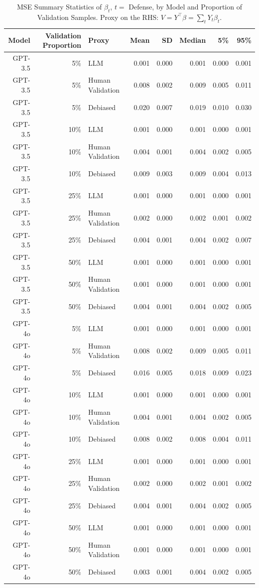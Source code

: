 \begin{table}

\caption{\label{tab:unnamed-chunk-1}MSE Summary Statistics of $\beta_{t}$, $t=$ Defense, by Model and Proportion of Validation Samples.
      Proxy on the RHS: $V = Y^\top \beta = \sum_{t} Y_t \beta_t$.}
\centering
\begin{tabular}[t]{rrlrrrrr}
\toprule
Model & Validation Proportion & Proxy & Mean & SD & Median & 5\% & 95\%\\
\midrule
GPT-3.5 & 5\% & LLM & 0.001 & 0.000 & 0.001 & 0.000 & 0.001\\
GPT-3.5 & 5\% & Human Validation & 0.008 & 0.002 & 0.009 & 0.005 & 0.011\\
GPT-3.5 & 5\% & Debiased & 0.020 & 0.007 & 0.019 & 0.010 & 0.030\\
GPT-3.5 & 10\% & LLM & 0.001 & 0.000 & 0.001 & 0.000 & 0.001\\
GPT-3.5 & 10\% & Human Validation & 0.004 & 0.001 & 0.004 & 0.002 & 0.005\\
GPT-3.5 & 10\% & Debiased & 0.009 & 0.003 & 0.009 & 0.004 & 0.013\\
GPT-3.5 & 25\% & LLM & 0.001 & 0.000 & 0.001 & 0.000 & 0.001\\
GPT-3.5 & 25\% & Human Validation & 0.002 & 0.000 & 0.002 & 0.001 & 0.002\\
GPT-3.5 & 25\% & Debiased & 0.004 & 0.001 & 0.004 & 0.002 & 0.007\\
GPT-3.5 & 50\% & LLM & 0.001 & 0.000 & 0.001 & 0.000 & 0.001\\
GPT-3.5 & 50\% & Human Validation & 0.001 & 0.000 & 0.001 & 0.000 & 0.001\\
GPT-3.5 & 50\% & Debiased & 0.004 & 0.001 & 0.004 & 0.002 & 0.005\\
GPT-4o & 5\% & LLM & 0.001 & 0.000 & 0.001 & 0.000 & 0.001\\
GPT-4o & 5\% & Human Validation & 0.008 & 0.002 & 0.009 & 0.005 & 0.011\\
GPT-4o & 5\% & Debiased & 0.016 & 0.005 & 0.018 & 0.009 & 0.023\\
GPT-4o & 10\% & LLM & 0.001 & 0.000 & 0.001 & 0.000 & 0.001\\
GPT-4o & 10\% & Human Validation & 0.004 & 0.001 & 0.004 & 0.002 & 0.005\\
GPT-4o & 10\% & Debiased & 0.008 & 0.002 & 0.008 & 0.004 & 0.011\\
GPT-4o & 25\% & LLM & 0.001 & 0.000 & 0.001 & 0.000 & 0.001\\
GPT-4o & 25\% & Human Validation & 0.002 & 0.000 & 0.002 & 0.001 & 0.002\\
GPT-4o & 25\% & Debiased & 0.004 & 0.001 & 0.004 & 0.002 & 0.005\\
GPT-4o & 50\% & LLM & 0.001 & 0.000 & 0.001 & 0.000 & 0.001\\
GPT-4o & 50\% & Human Validation & 0.001 & 0.000 & 0.001 & 0.000 & 0.001\\
GPT-4o & 50\% & Debiased & 0.003 & 0.001 & 0.004 & 0.002 & 0.005\\
\bottomrule
\end{tabular}
\end{table}
